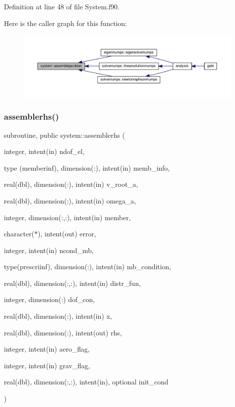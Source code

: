 Definition at line 48 of file System.\+f90.

Here is the caller graph for this function\+:\nopagebreak
\begin{figure}[H]
\begin{center}
\leavevmode
\includegraphics[width=350pt]{namespacesystem_aca86d62bded01533c138c9e2298cc804_icgraph}
\end{center}
\end{figure}
\mbox{\label{namespacesystem_a442f9666f95d674029a7fbe213b47f8a}} 
\subsubsection{\texorpdfstring{assemblerhs()}{assemblerhs()}}
{\footnotesize\ttfamily subroutine, public system\+::assemblerhs (\begin{DoxyParamCaption}\item[{integer, intent(in)}]{ndof\+\_\+el,  }\item[{type (memberinf), dimension(\+:), intent(in)}]{memb\+\_\+info,  }\item[{real(dbl), dimension(\+:), intent(in)}]{v\+\_\+root\+\_\+a,  }\item[{real(dbl), dimension(\+:), intent(in)}]{omega\+\_\+a,  }\item[{integer, dimension(\+:,\+:), intent(in)}]{member,  }\item[{character($\ast$), intent(out)}]{error,  }\item[{integer, intent(in)}]{ncond\+\_\+mb,  }\item[{type(prescriinf), dimension(\+:), intent(in)}]{mb\+\_\+condition,  }\item[{real(dbl), dimension(\+:,\+:), intent(in)}]{distr\+\_\+fun,  }\item[{integer, dimension(\+:)}]{dof\+\_\+con,  }\item[{real(dbl), dimension(\+:), intent(in)}]{x,  }\item[{real(dbl), dimension(\+:), intent(out)}]{rhs,  }\item[{integer, intent(in)}]{aero\+\_\+flag,  }\item[{integer, intent(in)}]{grav\+\_\+flag,  }\item[{real(dbl), dimension(\+:,\+:), intent(in), optional}]{init\+\_\+cond }\end{DoxyParamCaption})}



